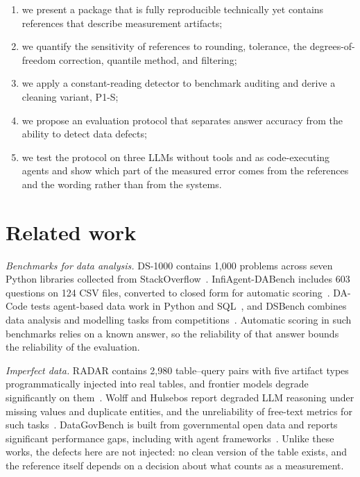 \documentclass[default]{subfiles}
\begin{document}
{\begin{enumerate}
  \item we present a package that is fully reproducible technically yet contains references that describe measurement artifacts;
  \item we quantify the sensitivity of references to rounding, tolerance, the degrees-of-freedom correction, quantile method, and filtering;
  \item we apply a constant-reading detector to benchmark auditing and derive a cleaning variant, P1-S;
  \item we propose an evaluation protocol that separates answer accuracy from the ability to detect data defects;
  \item we test the protocol on three LLMs without tools and as code-executing agents and show which part of the measured error comes from the references and the wording rather than from the systems.
\end{enumerate}

\section{Related work}

\emph{Benchmarks for data analysis.} DS-1000 contains 1,000 problems across seven Python libraries collected from StackOverflow~\cite{lai2023}. InfiAgent-DABench includes 603 questions on 124 CSV files, converted to closed form for automatic scoring~\cite{hu2024}. DA-Code tests agent-based data work in Python and SQL~\cite{huang2024}, and DSBench combines data analysis and modelling tasks from competitions~\cite{jing2024}. Automatic scoring in such benchmarks relies on a known answer, so the reliability of that answer bounds the reliability of the evaluation.

\emph{Imperfect data.} RADAR contains 2,980 table--query pairs with five artifact types programmatically injected into real tables, and frontier models degrade significantly on them~\cite{gu2025}. Wolff and Hulsebos report degraded LLM reasoning under missing values and duplicate entities, and the unreliability of free-text metrics for such tasks~\cite{wolff2025}. DataGovBench is built from governmental open data and reports significant performance gaps, including with agent frameworks~\cite{hasegawa2026}. Unlike these works, the defects here are not injected: no clean version of the table exists, and the reference itself depends on a decision about what counts as a measurement.

}
\end{document}
